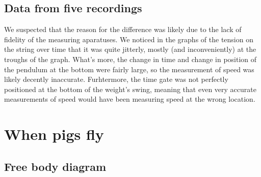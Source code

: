 \documentclass[11pt, letterpaper, includehead]{article}
\begin{document}
\subsection{Data from five recordings}

We suspected that the reason for the difference was likely due to the lack of fidelity
of the measuring aparatuses. We noticed in the graphs of the tension on the string over
time that it was quite jitterly, mostly (and inconveniently) at the troughs of the graph.
What's more, the change in time and change in position of the pendulum at the bottom were
fairly large, so the measurement of speed was likely decently inaccurate. Furhtermore, the 
time gate was not perfectly positioned at the bottom of the weight's swing, meaning that
even very accurate measurements of speed would have been measuring speed at the wrong location.

\section{When pigs fly}

\subsection{Free body diagram}
\begin{multicols}{2}
  \centering

  \columnbreak

\end{multicols}
\end{document}
